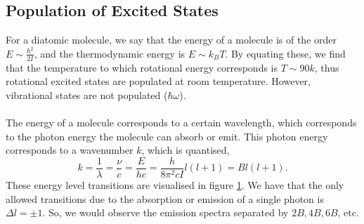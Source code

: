 \documentclass{book}
\begin{document}
\subsection{Population of Excited States}
For a diatomic molecule, we say that the energy of a molecule is of the order $E \sim \frac{\hbar^2}{2I}$, and the thermodynamic energy is $E \sim k_BT$. By equating these, we find that the temperature to which rotational energy corresponds is $T \sim 90k$, thus rotational excited states are populated at room temperature. However, vibrational states are not populated ($\hbar \omega$).
\\\\
The energy of a molecule corresponds to a certain wavelength, which corresponds to the photon energy the molecule can absorb or emit. This photon energy corresponds to a wavenumber $k$, which is quantised, 
\begin{equation}
	k = \frac{1}{\lambda} = \frac{\nu}{c} = \frac{E}{hc} = \frac{h}{8\pi^2cI}l(l+1) = Bl(l+1).
\end{equation} 
These energy level transitions are visualised in figure \ref{fig:energy tans}. We have that the only allowed transitions due to the absorption or emission of a single photon is $\Delta l = \pm 1$. So, we would observe the emission spectra separated by $2B, 4B, 6B$, etc.

\begin{figure}
	\centering
	\caption{}
	\label{fig:energy tans}
\end{figure}
\end{document}
